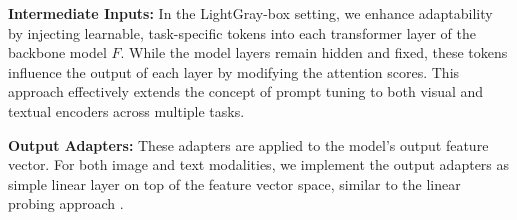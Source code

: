 \textbf{Intermediate Inputs:} In the LightGray-box setting, we enhance adaptability by injecting learnable, task-specific tokens into each transformer layer of the backbone model $F$. While the model layers remain hidden and fixed, these tokens influence the output of each layer by modifying the attention scores. This approach effectively extends the concept of prompt tuning \citep{prompt_tunning2} to both visual and textual encoders across multiple tasks.

\textbf{Output Adapters:} These adapters are applied to the model's output feature vector. For both image and text modalities, we implement the output adapters as simple linear layer on top of the feature vector space, similar to the linear probing approach \citep{DinoV2,clip}.


